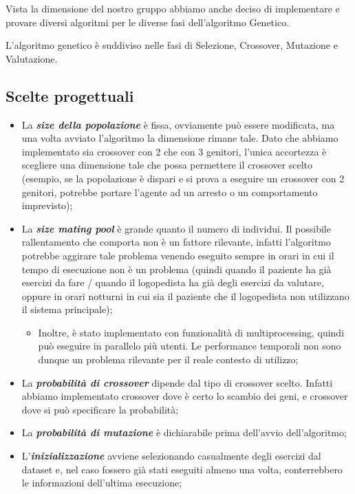 \documentclass{article}
\begin{document}
Vista la dimensione del nostro gruppo abbiamo anche deciso di implementare e provare diversi algoritmi per le diverse fasi dell'algoritmo Genetico.

L'algoritmo genetico è suddiviso nelle fasi di Selezione, Crossover, Mutazione e Valutazione.

\subsection{Scelte progettuali}

\begin{itemize}
\item La \textbf{\textit{size della popolazione}} è fissa, ovviamente può essere modificata, ma una volta avviato l'algoritmo la dimensione rimane tale. Dato che abbiamo implementato sia crossover con 2 che con 3 genitori, l'unica accortezza è scegliere una dimensione tale che possa permettere il crossover scelto (esempio, se la popolazione è dispari e si prova a eseguire un crossover con 2 genitori, potrebbe portare l'agente ad un arresto o un comportamento imprevisto);

\item La \textbf{\textit{size mating pool}} è grande quanto il numero di individui. Il possibile rallentamento che comporta non è un fattore rilevante, infatti l'algoritmo potrebbe aggirare tale problema venendo eseguito sempre in orari in cui il tempo di esecuzione non è un problema (quindi quando il paziente ha già esercizi da fare / quando il logopedista ha già degli esercizi da valutare, oppure in orari notturni in cui sia il paziente che il logopedista non utilizzano il sistema principale);
\begin{itemize}
    \item Inoltre, è stato implementato con funzionalità di multiprocessing, quindi può eseguire in parallelo più utenti. Le performance temporali non sono dunque un problema rilevante per il reale contesto di utilizzo;
\end{itemize}
\item La \textbf{\textit{probabilità di crossover}} dipende dal tipo di crossover scelto. Infatti abbiamo implementato crossover dove è certo lo scambio dei geni, e crossover dove si può specificare la probabilità;

\item La \textbf{\textit{probabilità di mutazione}} è dichiarabile prima dell'avvio dell'algoritmo;

\item L'\textbf{\textit{inizializzazione}} avviene selezionando casualmente degli esercizi dal dataset e, nel caso fossero già stati eseguiti almeno una volta, conterrebbero le informazioni dell'ultima esecuzione;


\end{itemize}
\end{document}
